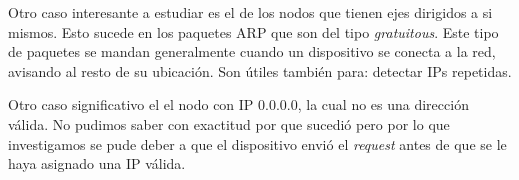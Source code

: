\documentclass[a4paper]{article}
\begin{document}
Otro caso interesante a estudiar es el de los nodos que tienen ejes dirigidos a si mismos. Esto sucede en los paquetes ARP que son del tipo \textit{gratuitous}. Este tipo de paquetes se mandan generalmente cuando un dispositivo se conecta a la red, avisando al resto de su ubicación. Son útiles también para: detectar IPs repetidas.

Otro caso significativo el el nodo con IP 0.0.0.0, la cual no es una dirección válida. No pudimos saber con exactitud por que sucedió pero por lo que investigamos se pude deber a que el dispositivo envió el \textit{request} antes de que se le haya asignado una IP válida. 


 
\end{document}
